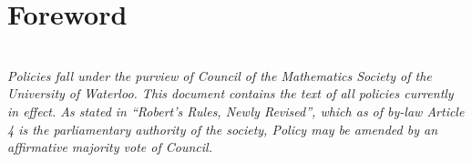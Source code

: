 \setcounter{secnumdepth}{0}

\section{Foreword}

\textit{
\\
Policies fall under the purview of Council of the Mathematics Society of the University of Waterloo.
This document contains the text of all policies currently in effect.
As stated in ``Robert's Rules, Newly Revised'', which as of by-law Article 4 is the parliamentary authority of the society, Policy may be amended by an affirmative majority vote of Council.
}

\setcounter{secnumdepth}{4}

